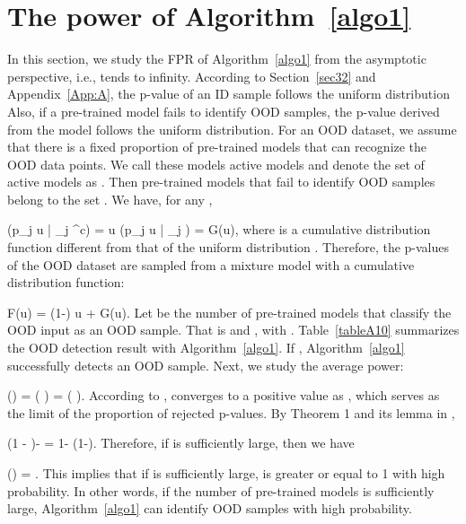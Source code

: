 \documentclass{article} \usepackage{iclr2023_conference,times}
\def\gA{{\mathcal{A}}}
\def\sP{{\mathbb{P}}}
\newcommand{\E}{\mathbb{E}}
\newcommand{\bbox}{\hfill }
\newcommand{\benrr}{}
\begin{document}
\bbox


\section{The power of Algorithm~\ref{algo1}}\label{App:B}

In this section, we study the FPR of Algorithm~\ref{algo1} from the asymptotic perspective, i.e.,  tends to infinity. According to Section~\ref{sec32} and Appendix~\ref{App:A}, the p-value of an ID sample follows the uniform distribution 
Also, if a pre-trained model fails to identify OOD samples, the p-value derived from the model follows the uniform distribution.
For an OOD dataset, we assume that there is a fixed proportion  of pre-trained models that can recognize the OOD data points.
We call these models active models and denote the set of active models as .
Then pre-trained models that fail to identify OOD samples belong to the set .
We have, for any ,
\benrr
\sP(p_j \leq u | \phi_j \in \gA^c) = u \quad {} \quad \sP(p_j \leq u | \phi_j \in \gA) = G(u), 
\eenrr
where  is a cumulative distribution function different from that of the uniform distribution .
Therefore, the p-values of the OOD dataset are sampled from a mixture model with a cumulative distribution function:
\benrr
F(u) = (1-\pi) u + \pi G(u).
\eenrr
Let  be the number of pre-trained models that classify the OOD input as an OOD sample.
That is  and ,  with .
Table~\ref{tableA10} summarizes the OOD detection result with Algorithm~\ref{algo1}.
If , Algorithm~\ref{algo1} successfully detects an OOD sample. Next, we study the average power:
\benrr
\E\big(\big) = \E\big( \big) = \E\big( \big). 
\eenrr
According to \cite{chi2007performance},  converges to a positive value  as , which serves as the limit of the proportion of rejected p-values.
By Theorem 1 and its lemma in \cite{benjamini1995controlling}, 
\benrr
\E\big(1 -  \big)-  \alpha = 1- (1-\pi)\alpha.
\eenrr
Therefore, if  is sufficiently large, then we have
\benrr
\E\big(\big) \geq {} \geq {} = .
\eenrr
This implies that if  is sufficiently large,  is greater or equal to 1 with high probability. In other words, if the number of pre-trained models is sufficiently large, Algorithm~\ref{algo1} can identify OOD samples with high probability.
\end{document}
